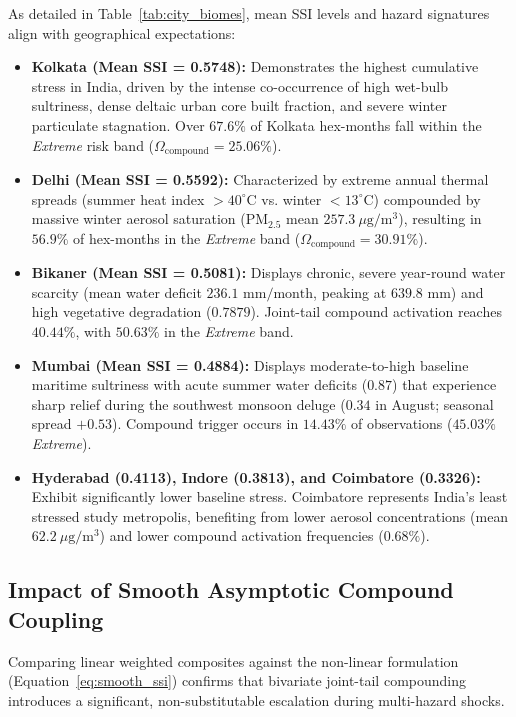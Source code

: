 As detailed in Table~\ref{tab:city_biomes}, mean SSI levels and hazard signatures align with geographical expectations:
\begin{itemize}
    \item \textbf{Kolkata (Mean SSI = 0.5748):} Demonstrates the highest cumulative stress in India, driven by the intense co-occurrence of high wet-bulb sultriness, dense deltaic urban core built fraction, and severe winter particulate stagnation. Over $67.6\%$ of Kolkata hex-months fall within the \textit{Extreme} risk band ($\Omega_{\text{compound}} = 25.06\%$).
    \item \textbf{Delhi (Mean SSI = 0.5592):} Characterized by extreme annual thermal spreads (summer heat index $>40^\circ\text{C}$ vs. winter $<13^\circ\text{C}$) compounded by massive winter aerosol saturation ($\text{PM}_{2.5}$ mean $257.3\ \mu\text{g}/\text{m}^3$), resulting in $56.9\%$ of hex-months in the \textit{Extreme} band ($\Omega_{\text{compound}} = 30.91\%$).
    \item \textbf{Bikaner (Mean SSI = 0.5081):} Displays chronic, severe year-round water scarcity (mean water deficit $236.1\text{ mm}/\text{month}$, peaking at $639.8\text{ mm}$) and high vegetative degradation ($0.7879$). Joint-tail compound activation reaches $40.44\%$, with $50.63\%$ in the \textit{Extreme} band.
    \item \textbf{Mumbai (Mean SSI = 0.4884):} Displays moderate-to-high baseline maritime sultriness with acute summer water deficits ($0.87$) that experience sharp relief during the southwest monsoon deluge ($0.34$ in August; seasonal spread $+0.53$). Compound trigger occurs in $14.43\%$ of observations ($45.03\%$ \textit{Extreme}).
    \item \textbf{Hyderabad (0.4113), Indore (0.3813), and Coimbatore (0.3326):} Exhibit significantly lower baseline stress. Coimbatore represents India's least stressed study metropolis, benefiting from lower aerosol concentrations (mean $62.2\ \mu\text{g}/\text{m}^3$) and lower compound activation frequencies ($0.68\%$).
\end{itemize}

\subsection{Impact of Smooth Asymptotic Compound Coupling}
Comparing linear weighted composites against the non-linear formulation (Equation~\ref{eq:smooth_ssi}) confirms that bivariate joint-tail compounding introduces a significant, non-substitutable escalation during multi-hazard shocks.

